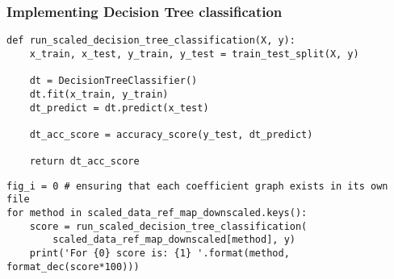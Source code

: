 \subsubsection{Implementing Decision Tree classification}
\begin{code}
\label{code:generic-decision-tree-impl}
\begin{verbatim}
def run_scaled_decision_tree_classification(X, y):
    x_train, x_test, y_train, y_test = train_test_split(X, y)

    dt = DecisionTreeClassifier()
    dt.fit(x_train, y_train)
    dt_predict = dt.predict(x_test)

    dt_acc_score = accuracy_score(y_test, dt_predict)

    return dt_acc_score
\end{verbatim}
\end{code}

\begin{code}
\label{code:generic-decision-tree-impl}
\begin{verbatim}
fig_i = 0 # ensuring that each coefficient graph exists in its own file
for method in scaled_data_ref_map_downscaled.keys():
    score = run_scaled_decision_tree_classification(
        scaled_data_ref_map_downscaled[method], y)
    print('For {0} score is: {1} '.format(method, format_dec(score*100)))
\end{verbatim}
\end{code}